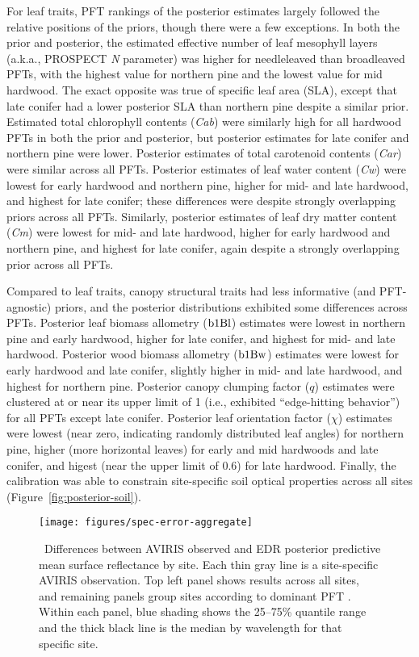 For leaf traits, PFT rankings of the posterior estimates largely followed the relative positions of the priors, though there were a few exceptions.
In both the prior and posterior, the estimated effective number of leaf mesophyll layers (a.k.a., PROSPECT \emph{N} parameter) was higher for needleleaved than broadleaved PFTs, with the highest value for northern pine and the lowest value for mid hardwood.
The exact opposite was true of specific leaf area (SLA), except that late conifer had a lower posterior SLA than northern pine despite a similar prior.
Estimated total chlorophyll contents (\emph{Cab}) were similarly high for all hardwood PFTs in both the prior and posterior,
but posterior estimates for late conifer and northern pine were lower.
Posterior estimates of total carotenoid contents (\emph{Car}) were similar across all PFTs.
Posterior estimates of leaf water content (\emph{Cw}) were lowest for early hardwood and northern pine, higher for mid- and late hardwood, and highest for late conifer; these differences were despite strongly overlapping priors across all PFTs.
Similarly, posterior estimates of leaf dry matter content (\emph{Cm}) were lowest for mid- and late hardwood, higher for early hardwood and northern pine, and highest for late conifer, again despite a strongly overlapping prior across all PFTs.

Compared to leaf traits, canopy structural traits had less informative (and PFT-agnostic) priors, and the posterior distributions exhibited some differences across PFTs.
Posterior leaf biomass allometry ($\mathrm{b1Bl}$) estimates were lowest in northern pine and early hardwood, higher for late conifer, and highest for mid- and late hardwood.
Posterior wood biomass allometry ($\mathrm{b1Bw}$) estimates were lowest for early hardwood and late conifer, slightly higher in mid- and late hardwood, and highest for northern pine.
Posterior canopy clumping factor ($q$) estimates were clustered at or near its upper limit of 1 (i.e., exhibited ``edge-hitting behavior'') for all PFTs except late conifer.
Posterior leaf orientation factor ($\chi$) estimates were lowest (near zero, indicating randomly distributed leaf angles) for northern pine, higher (more horizontal leaves) for early and mid hardwoods and late conifer, and higest (near the upper limit of 0.6) for late hardwood.
Finally, the calibration was able to constrain site-specific soil optical properties across all sites (Figure~\ref{fig:posterior-soil}).

\begin{figure}
  \centering
  \texttt{[image: figures/spec-error-aggregate]}
  \caption{\label{fig:spec-error-aggregate}\
    Differences between AVIRIS observed and EDR posterior predictive mean surface reflectance by site.
    Each thin gray line is a site-specific AVIRIS observation.
    Top left panel shows results across all sites,
    and remaining panels group sites according to dominant PFT .
    Within each panel, blue shading shows the 25--75\% quantile range and the thick black line is the median by wavelength for that specific site.
  }
\end{figure}

